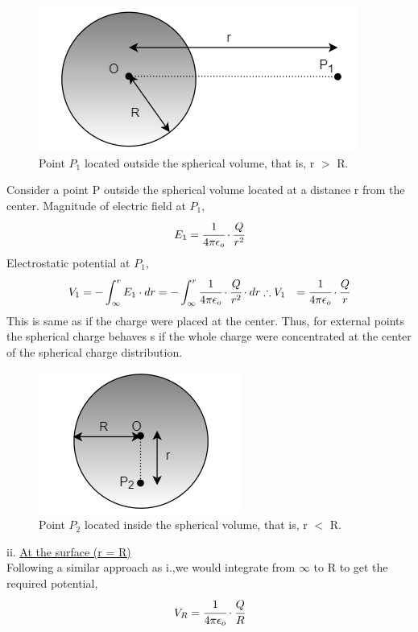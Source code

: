 \begin{figure}
     \centering 
     \includegraphics[scale = 0.6]{figures/Sandesh's Figures/fig5.png}
     \caption{Point $P_1$ located outside the spherical volume, that is, r $>$ R. }
     \label{fig5}
 \end{figure}
Consider a point P outside the spherical volume located at a distance r from the center.
Magnitude of electric field at $P_1$,
\[E_1 = \cfrac{1}{4 \pi \epsilon_o}\cdot \cfrac{Q}{r^2}\]
Electrostatic potential at $P_1$,
\begin{align*}
V_1 = -\int_\infty^r E_1 \cdot dr &= - \int_\infty^r \cfrac{1}{4 \pi \epsilon_o}\cdot \cfrac{Q}{r^2} \cdot dr
 \therefore V_1 &= \cfrac{1}{4 \pi \epsilon_o}\cdot \cfrac{Q}{r} 
\end{align*}
This is same as if the charge were placed at the center. Thus, for external points the spherical charge behaves s if the whole charge were concentrated at the center of the spherical charge distribution.
\vspace{4pt}\\
\begin{figure}
     \centering 
     \includegraphics[scale = 0.7]{figures/Sandesh's Figures/fig6.png}
     \caption{Point $P_2$ located inside the spherical volume, that is, r $<$ R. }
     \label{fig5}
 \end{figure}
ii. \underline{At the surface (r = R)}
\vspace{5pt}
\\ Following a similar approach as i.,we would integrate from $\infty$ to R to get the required potential, 
\[ V_R = \cfrac{1}{4 \pi \epsilon_o}\cdot \cfrac{Q}{R} \]

